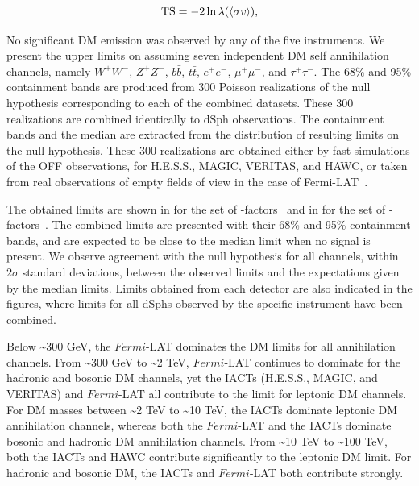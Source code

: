 \begin{equation}
    \mathrm{TS} = -2 \ln{ \lambda(\langle \sigma \mathit{v} \rangle)},
\end{equation}

\sloppy No significant DM emission was observed by any of the five instruments.
We present the upper limits on \sv assuming seven independent DM self annihilation channels, namely $W^+W^-$, $Z^+Z^-$, $b\bar{b}$, $t\bar{t}$, $e^+e^-$, $\mu^+\mu^-$, and $\tau^+\tau^-$.
The 68\% and 95\% containment bands are produced from 300 Poisson realizations of the null hypothesis corresponding to each of the combined datasets.
These 300 realizations are combined identically to dSph observations.
The containment bands and the median are extracted from the distribution of resulting limits on the null hypothesis.
These 300 realizations are obtained either by fast simulations of the OFF observations, for H.E.S.S., MAGIC, VERITAS, and HAWC, or taken from real observations of empty fields of view in the case of Fermi-LAT~\cite{2015PhRvL.115w1301A,Fermi-LAT:2016uux,2021PhRvD.103l3005D}.

The obtained limits are shown in  for the \GS set of \J-factors~\cite{Geringer-Sameth:2014yza} and in  for the \B set of \J-factors~\cite{Bonnivard:2014kza, Bonnivard:2015xpq}.
The combined limits are presented with their 68\% and 95\% containment bands, and are expected to be close to the median limit when no signal is present.
We observe agreement with the null hypothesis for all channels, within $2\sigma$ standard deviations, between the observed limits and the expectations given by the median limits.
Limits obtained from each detector are also indicated in the figures, where limits for all dSphs observed by the specific instrument have been combined.

Below \textasciitilde300 GeV, the $Fermi$-LAT dominates the DM limits for all annihilation channels.
From \textasciitilde300 GeV to \textasciitilde2 TeV, $Fermi$-LAT continues to dominate for the hadronic and bosonic DM channels, yet the IACTs (H.E.S.S., MAGIC, and VERITAS) and $Fermi$-LAT all contribute to the limit for leptonic DM channels.
For DM masses between \textasciitilde2 TeV to \textasciitilde10 TeV, the IACTs dominate leptonic DM annihilation channels, whereas both the $Fermi$-LAT and the IACTs dominate bosonic and hadronic DM annihilation channels.
From \textasciitilde10 TeV to \textasciitilde100 TeV, both the IACTs and HAWC contribute significantly to the leptonic DM limit.
For hadronic and bosonic DM, the IACTs and $Fermi$-LAT both contribute strongly.

